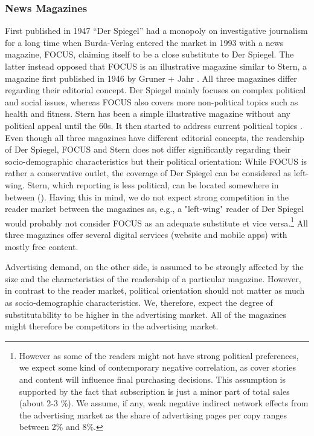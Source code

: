 \documentclass[12pt,a4paper,notitlepage]{article}
\begin{document}
\subsubsection{News Magazines} 

First published in 1947 ``Der Spiegel'' had a monopoly on investigative journalism for a long time when Burda-Verlag entered the market in 1993 with a news magazine, FOCUS, claiming itself to be a close substitute to Der Spiegel. The latter instead opposed that FOCUS is an illustrative magazine similar to Stern, a magazine first published in 1946 by Gruner + Jahr \citep{kaltenhaeuser_abstimmung_2005}. All three magazines differ regarding their editorial concept. Der Spiegel mainly focuses on complex political and social issues, whereas FOCUS also covers more non-political topics such as health and fitness. Stern has been a simple illustrative magazine without any political appeal until the 60s. It then started to address current political topics \citep{vogel_populaere_1998}. Even though all three magazines have different editorial concepts, the readership of Der Spiegel, FOCUS and Stern does not differ significantly regarding their socio-demographic characteristics but their political orientation: While FOCUS is rather a conservative outlet, the coverage of Der Spiegel can be considered as left-wing. Stern, which reporting is less political, can be located somewhere in between (\citet{kaltenhaeuser_abstimmung_2005}). Having this in mind, we do not expect strong competition in the reader market between the magazines as, e.g., a "left-wing" reader of Der Spiegel would probably not consider FOCUS as an adequate substitute et vice versa.\footnote{However as some of the readers might not have strong political preferences, we expect some kind of contemporary negative correlation, as cover stories and content will influence final purchasing decisions. This assumption is supported by the fact that subscription is just a minor part of total sales (about 2-3 $\%$). We assume, if any, weak negative indirect network effects from the advertising market as the share of advertising pages per copy ranges between 2$\%$ and 8$\%$.} All three magazines offer several digital services (website and mobile apps) with mostly free content. 

Advertising demand, on the other side, is assumed to be strongly affected by the size and the characteristics of the readership of a particular magazine. However, in contrast to the reader market, political orientation should not matter as much as socio-demographic characteristics. We, therefore, expect the degree of substitutability to be higher in the advertising market. All of the magazines might therefore be competitors in the advertising market.  
\end{document}
